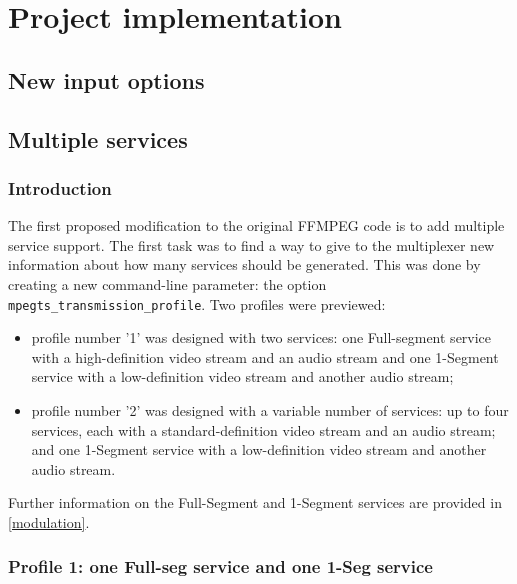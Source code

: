 \documentclass[
	12pt,				%
	openright,			%
	twoside,			%
	a4paper,			%
	brazil,
	french,				%
	english
	]{abntex2}
\begin{document}

\chapter{Project implementation}

\section{New input options}

\section{Multiple services}

\subsection{Introduction}

The first proposed modification to the original FFMPEG code is to add multiple service support. The first task was to find a way to give to the multiplexer new information about how many services should be generated. This was done by creating a new command-line parameter: the option \texttt{mpegts\_transmission\_profile}. Two profiles were previewed:
\begin{itemize}
\item profile number '1' was designed with two services: one Full-segment service with a high-definition video stream and an audio stream and one 1-Segment service with a low-definition video stream and another audio stream;
\item profile number '2' was designed with a variable number of services: up to four services, each with a standard-definition video stream and an audio stream; and one  1-Segment service with a low-definition video stream and another audio stream.
\end{itemize}

Further information on the Full-Segment and 1-Segment services are provided in \autoref{modulation}.

\subsection{Profile 1: one Full-seg service and one 1-Seg service}
\end{document}
